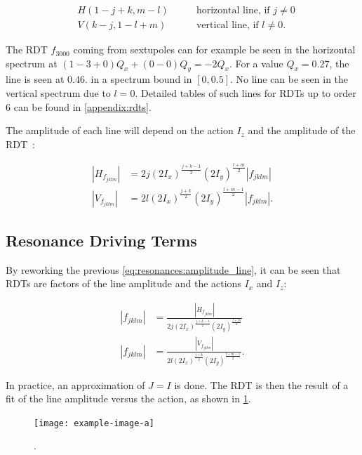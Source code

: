 \begin{equation}
    \begin{aligned}
    & H(1 - j + k, m - l) \quad\quad& \mbox{horizontal line, if } j \ne 0 \\
    & V(k - j, 1 - l + m) \quad\quad& \mbox{vertical line, if } l \ne 0.
    \end{aligned}
    \label{eq:resonances:rdt_spectrum}
\end{equation}

The RDT $f_{3000}$ coming from sextupoles can for example be seen in the horizontal spectrum at
$(1-3+0)Q_x + (0-0)Q_y = -2Q_x$. For a value $Q_x = 0.27$, the line is seen at $0.46$. in a spectrum
bound in $[0, 0.5]$. No line can be seen in the vertical spectrum due to $l = 0$.
Detailed tables of such lines for RDTs up to order 6 can be found in \cref{appendix:rdts}.

The amplitude of each line will depend on the action $I_z$ and the amplitude of the
RDT~\cite{bartolini_normal_1997}:

\begin{equation}
    \begin{aligned}
    |H_{f_{jklm}}| &= 2 j (2 I_x)^\frac{j+k-1}{2} (2 I_y)^\frac{l+m}{2} |f_{jklm}| \\
    |V_{f_{jklm}}| &= 2 l (2 I_x)^\frac{j+k}{2} (2 I_y)^\frac{l+m-1}{2} |f_{jklm}|.
    \end{aligned}
    \label{eq:resonances:amplitude_line}
\end{equation}


\subsection{Resonance Driving Terms}

By reworking the previous \cref{eq:resonances:amplitude_line}, it can be seen that RDTs are factors
of the line amplitude and the actions $I_x$ and $I_z$:

\begin{equation}
    \begin{aligned}
    |f_{jklm}| &= \frac{|H_{f_{jklm}}|}{2 j (2 I_x)^\frac{j+k-1}{2} (2 I_y)^\frac{l+m}{2}} \\
    |f_{jklm}| &= \frac{|V_{f_{jklm}}|}{2 l (2 I_x)^\frac{j+k}{2} (2 I_y)^\frac{l+m-1}{2}} .
    \label{eq:resonances:amplitude_rdt}
    \end{aligned}
\end{equation}

In practice, an approximation of $J = I$ is done. The RDT is then the result of a fit of the line
amplitude versus the action, as shown in \cref{fig:resonances:fit_rdt}.

\begin{figure}[H]
    \centering
    \texttt{[image: example-image-a]}
    \caption{.}
    \label{fig:resonances:fit_rdt}
\end{figure}